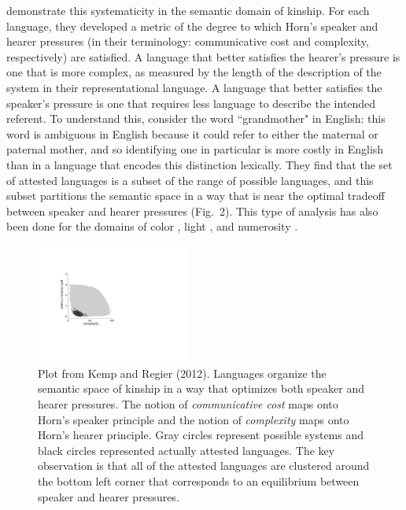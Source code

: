 \documentclass[man, noapacite, 12pt]{apa2}
\begin{document}
  demonstrate this systematicity in the semantic domain of kinship. For each language, they developed a metric of the degree to which  Horn's speaker and hearer pressures (in their terminology: communicative cost and complexity, respectively) are satisfied. A language that better satisfies the hearer's pressure is one that is more complex, as measured by the length of the description of the system in their representational language. A language that better satisfies the speaker's pressure is one that requires less language to describe the intended referent. To understand this, consider the word ``grandmother" in English: this word is ambiguous in English because it could refer to either the maternal or paternal mother, and so identifying one in particular is more costly in English than in a language that encodes this distinction lexically. They find that the set of attested languages is a subset of the range of possible languages, and this subset partitions the  semantic space in a way that is near the optimal tradeoff between speaker and hearer pressures (Fig.\ 2). This type of analysis has also been done for the domains of color \cite{regier2007color}, light \cite{baddeley2009relationship}, and numerosity \cite{xu4numeral}.
 
 \begin{figure}
\begin{center} 
\includegraphics[width=2in]{figs/kemp2012.pdf}
\caption{\label{fig:frank2012} Plot  from Kemp and Regier (2012). Languages organize the semantic space of kinship in a way that optimizes both speaker and hearer pressures. The notion of {\it communicative cost} maps onto Horn's speaker principle and the notion of {\it complexity} maps onto Horn's hearer principle. Gray circles represent possible systems and black circles represented actually attested languages. The key observation is that all of the attested languages are clustered around the bottom left corner that corresponds to an equilibrium between speaker and hearer pressures.} 
\end{center} 
\end{figure}
\end{document}
